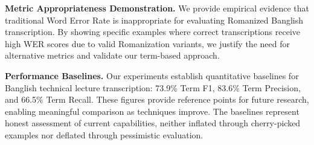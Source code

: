 \textbf{Metric Appropriateness Demonstration.} We provide empirical evidence that traditional Word Error Rate is inappropriate for evaluating Romanized Banglish transcription. By showing specific examples where correct transcriptions receive high WER scores due to valid Romanization variants, we justify the need for alternative metrics and validate our term-based approach.

\textbf{Performance Baselines.} Our experiments establish quantitative baselines for Banglish technical lecture transcription: 73.9\% Term F1, 83.6\% Term Precision, and 66.5\% Term Recall. These figures provide reference points for future research, enabling meaningful comparison as techniques improve. The baselines represent honest assessment of current capabilities, neither inflated through cherry-picked examples nor deflated through pessimistic evaluation.





